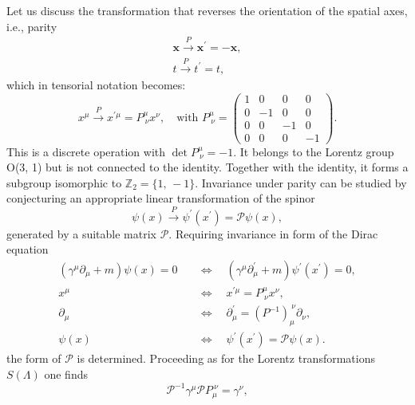 Let us discuss the transformation that reverses the orientation of the spatial axes, i.e., parity
\[
    \begin{aligned}
        \mathbf{x} \xrightarrow{P} \mathbf{x}^{\prime} = - \mathbf{x}, \\
        t \xrightarrow{P} t^{\prime} = t,
    \end{aligned}
\]
which in tensorial notation becomes:
\begin{equation}
    x^{\mu} \xrightarrow{P} x^{\prime \mu} = P^{\mu}_{\ \nu} x^{\nu}, \quad \text{with } P^{\mu}_{\ \nu} = \begin{pmatrix}
        1 & 0  & 0  & 0  \\
        0 & -1 & 0  & 0  \\
        0 & 0  & -1 & 0  \\
        0 & 0  & 0  & -1
    \end{pmatrix}.
    \label{eq:parity_transformation}
\end{equation}
This is a discrete operation with \(\det P^{\mu}_{\ \nu} = -1\). It belongs to the Lorentz group O(3, 1) but is not connected to the identity. Together with the identity, it forms a subgroup isomorphic to \(\mathbb{Z}_2 = \{1,\,-1\}\). Invariance under parity can be studied by conjecturing an appropriate linear transformation of the spinor
\[
    \psi(x) \xrightarrow{P} \psi^{\prime}(x^{\prime}) = \mathcal{P} \psi(x),
\]
generated by a suitable matrix \(\mathcal{P} \). Requiring invariance in form of the Dirac equation
\[
    \begin{aligned}
        \left(\gamma^{\mu} \partial_\mu + m \right)\psi(x) = 0 & \quad \iff \quad \left(\gamma^{\mu} \partial_\mu^{\prime} + m \right) \psi^{\prime} (x^{\prime}) = 0, \\
        x^{\mu}                                                & \quad \iff \quad x^{\prime \mu} = P^{\mu}_{\ \nu} x^{\nu},                                            \\
        \partial_{\mu}                                         & \quad \iff \quad \partial_{\mu}^{\prime} = \left(P^{-1}\right)_{\mu}^{\ \nu} \partial_{\nu},          \\
        \psi(x)                                                & \quad \iff \quad \psi^{\prime}(x^{\prime}) = \mathcal{P} \psi(x).
    \end{aligned}
\]
the form of \(\mathcal{P}\) is determined. Proceeding as for the Lorentz transformations \(S(\Lambda)\) one finds
\[
    \mathcal{P}^{-1} \gamma^{\mu} \mathcal{P} P^{\ \nu}_{\mu} = \gamma^{\nu},
\]
